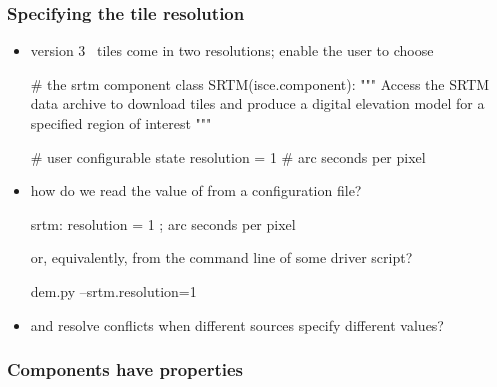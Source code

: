 \begin{frame}[fragile]
%
  \frametitle{Specifying the tile resolution}
%
  \begin{itemize}
%
  \item version 3 \srtm\ tiles come in two resolutions; enable the user to choose
%
    \begin{ipython}[firstnumber=4]{}
# the srtm component
class SRTM(isce.component):
    """
    Access the SRTM data archive to download tiles and produce
    a digital elevation model for a specified region of interest
    """

    # user configurable state
    resolution = 1 # arc seconds per pixel

    \end{ipython}
%
  \item how do we read the value of  from a configuration file?
%
    \begin{ipfg}{}
      srtm:
          resolution = 1 ; arc seconds per pixel
    \end{ipfg}
%
    or, equivalently, from the command line of some driver script?
%
    \begin{ish}{}
      dem.py --srtm.resolution=1
    \end{ish}
%
  \item and resolve conflicts when different sources specify different values?
%
  \end{itemize}
%
\end{frame}

\begin{frame}
%
  \frametitle{Components have properties}
%
  \begin{center}
  \end{center}
%
\end{frame}

